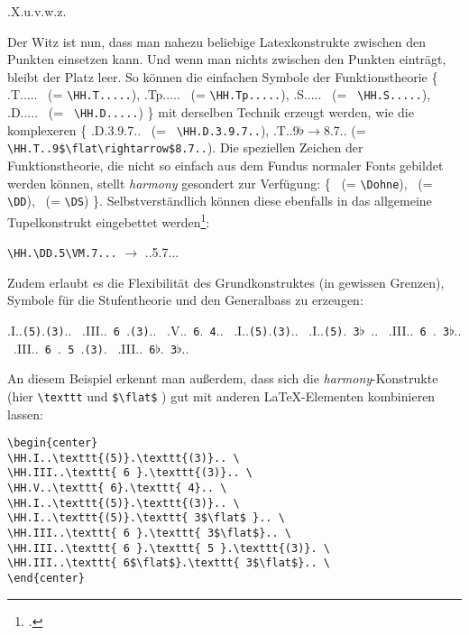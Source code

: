 \begin{center}
\HH.X.u.v.w.z.
\end{center}

Der Witz ist nun, dass man nahezu beliebige Latexkonstrukte zwischen den Punkten
einsetzen kann. Und wenn man nichts zwischen den Punkten einträgt, bleibt der
Platz leer. So können die einfachen Symbole der Funktionstheorie \{ \HH.T.....
\ (= \texttt{\small \textbackslash{HH.T.....}}), \HH.Tp.....  \ (=
\texttt{\small \textbackslash{HH.Tp.....}}), \HH.S.....  \ (= \texttt{\small
\textbackslash{HH.S.....}}), \HH.D.....  \ (= \texttt{\small
\textbackslash{HH.D.....}}) \} mit derselben Technik erzeugt werden, wie die
komplexeren \{ \HH.D.3.9.7..  \ (= \texttt{\small
\textbackslash{HH.D.3.9.7..}}), \HH.T..9$\flat\rightarrow$8.7..  (=
\verb|\HH.T..9$\flat\rightarrow$8.7..|).
Die speziellen Zeichen der Funktionstheorie, die nicht so einfach aus dem Fundus
normaler Fonts gebildet werden können, stellt  \textit{harmony} gesondert zur
Verfügung:
\{ \Dohne  \ (= \texttt{\small \textbackslash{Dohne}}), \DD \ (= \texttt{\small
\textbackslash{DD}}), \DS  \ (= \texttt{\small \textbackslash{DS}}) \}.
Selbstverständlich können diese ebenfalls in das allgemeine Tupelkonstrukt
eingebettet werden\footcite[Vgl. dazu][6]{WegWeg2007a}:
\begin{center}
 \texttt{\textbackslash{HH}.\textbackslash{DD}.5\textbackslash{VM}.7...}
 $\rightarrow$ \HH.\DD.5\VM.7...
\end{center}

Zudem erlaubt es die Flexibilität des Grundkonstruktes (in gewissen Grenzen),
Symbole für die Stufentheorie und den Generalbass zu erzeugen:

\begin{center}
\HH.I..\texttt{(5)}.\texttt{(3)}.. \
\HH.III..\texttt{ 6 }.\texttt{(3)}.. \
\HH.V..\texttt{ 6}.\texttt{ 4}.. \
\HH.I..\texttt{(5)}.\texttt{(3)}.. \
\HH.I..\texttt{(5)}.\texttt{ 3$\flat$ }.. \
\HH.III..\texttt{ 6 }.\texttt{ 3$\flat$}.. \
\HH.III..\texttt{ 6 }.\texttt{ 5 }.\texttt{(3)}. \
\HH.III..\texttt{ 6$\flat$}.\texttt{ 3$\flat$}.. \
\end{center}

An diesem Beispiel erkennt man außerdem, dass sich die
\textit{harmony}-Konstrukte (hier \texttt{\textbackslash{texttt}} und
\texttt{\$\textbackslash{flat}\$} ) gut mit anderen \LaTeX-Elementen kombinieren
lassen:
\begin{verbatim}
\begin{center}
\HH.I..\texttt{(5)}.\texttt{(3)}.. \
\HH.III..\texttt{ 6 }.\texttt{(3)}.. \
\HH.V..\texttt{ 6}.\texttt{ 4}.. \
\HH.I..\texttt{(5)}.\texttt{(3)}.. \
\HH.I..\texttt{(5)}.\texttt{ 3$\flat$ }.. \
\HH.III..\texttt{ 6 }.\texttt{ 3$\flat$}.. \
\HH.III..\texttt{ 6 }.\texttt{ 5 }.\texttt{(3)}. \
\HH.III..\texttt{ 6$\flat$}.\texttt{ 3$\flat$}.. \
\end{center}
\end{verbatim}

